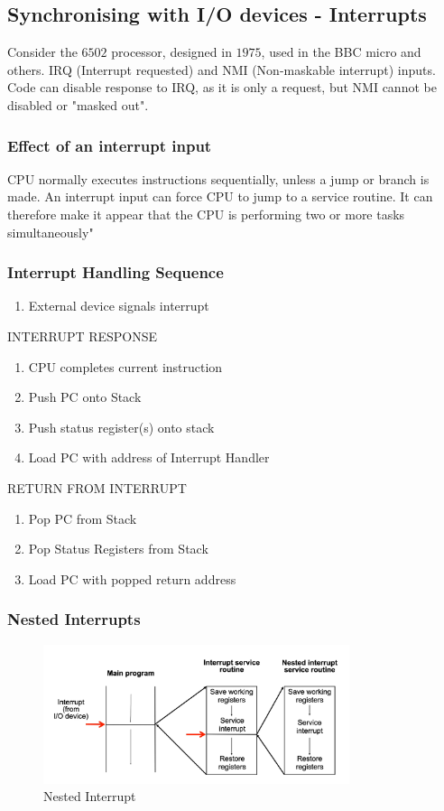 \documentclass[a4paper]{article}
\theoremstyle{plain}
\theoremstyle{definition}
\theoremstyle{remark}
\begin{document}
\subsection{Synchronising with I/O devices - Interrupts}
Consider the $6502$ processor, designed in $1975$, used in the BBC micro and others. IRQ (Interrupt requested) and NMI (Non-maskable interrupt) inputs. Code can disable response to IRQ, as it is only a request, but NMI cannot be disabled or "masked out". 
\subsubsection{Effect of an interrupt input}
CPU normally executes instructions sequentially, unless a jump or branch is made. An interrupt input can force CPU to jump to a service routine. It can therefore make it appear that the CPU is performing two or more tasks simultaneously" 
\subsubsection{Interrupt Handling Sequence}
\begin{enumerate}
	\item External device signals interrupt
\end{enumerate}
INTERRUPT RESPONSE
\begin{enumerate}
	\item CPU completes current instruction
	\item Push PC onto Stack
	\item Push status register(s) onto stack
	\item Load PC with address of Interrupt Handler
\end{enumerate}
RETURN FROM INTERRUPT
\begin{enumerate}
	\item Pop PC from Stack
	\item Pop Status Registers from Stack
	\item Load PC with popped return address
\end{enumerate}
\subsubsection{Nested Interrupts}
\begin{figure}[H]
	\centering
	\includegraphics[width=0.8\textwidth]{figures/nestedinterrupt.png}
	\caption{Nested Interrupt}
	\label{fig:nestedInterrupt}
\end{figure}
\end{document}
